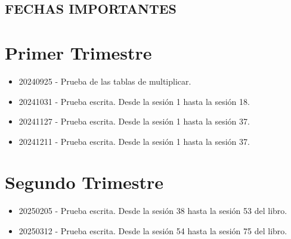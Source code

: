 \documentclass[a4paper,12pt]{article}
\begin{document}
\begin{center}
    \section*{FECHAS IMPORTANTES}
\end{center}

\tableofcontents

\newpage

\sloppy %

\section{Primer Trimestre}

\begin{itemize}
    \item 20240925 - Prueba de las tablas de multiplicar.
    \item 20241031 - Prueba escrita. Desde la sesión 1 hasta la sesión 18.
    \item 20241127 - Prueba escrita. Desde la sesión 1 hasta la sesión 37.
    \item 20241211 - Prueba escrita. Desde la sesión 1 hasta la sesión 37.
\end{itemize}

\section{Segundo Trimestre}

\begin{itemize}
    \item 20250205 - Prueba escrita. Desde la sesión 38 hasta la sesión 53 del libro.
\end{itemize}

\begin{itemize}
    \item 20250312 - Prueba escrita. Desde la sesión 54 hasta la sesión 75 del libro.
\end{itemize}
\end{document}
